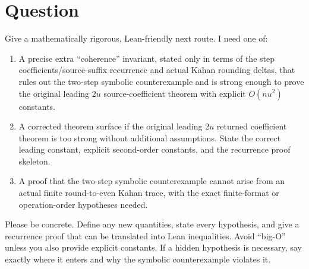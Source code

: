 \documentclass{article}
\begin{document}
\section*{Question}

Give a mathematically rigorous, Lean-friendly next route.  I need one of:

\begin{enumerate}
\item A precise extra ``coherence'' invariant, stated only in terms of the
step coefficients/source-suffix recurrence and actual Kahan rounding deltas,
that rules out the two-step symbolic counterexample and is strong enough to
prove the original leading \(2u\) source-coefficient theorem with explicit
\(O(nu^2)\) constants.

\item A corrected theorem surface if the original leading \(2u\) returned
coefficient theorem is too strong without additional assumptions.  State the
correct leading constant, explicit second-order constants, and the recurrence
proof skeleton.

\item A proof that the two-step symbolic counterexample cannot arise from an
actual finite round-to-even Kahan trace, with the exact finite-format or
operation-order hypotheses needed.
\end{enumerate}

Please be concrete.  Define any new quantities, state every hypothesis, and
give a recurrence proof that can be translated into Lean inequalities.  Avoid
``big-O'' unless you also provide explicit constants.  If a hidden hypothesis
is necessary, say exactly where it enters and why the symbolic counterexample
violates it.
\end{document}
